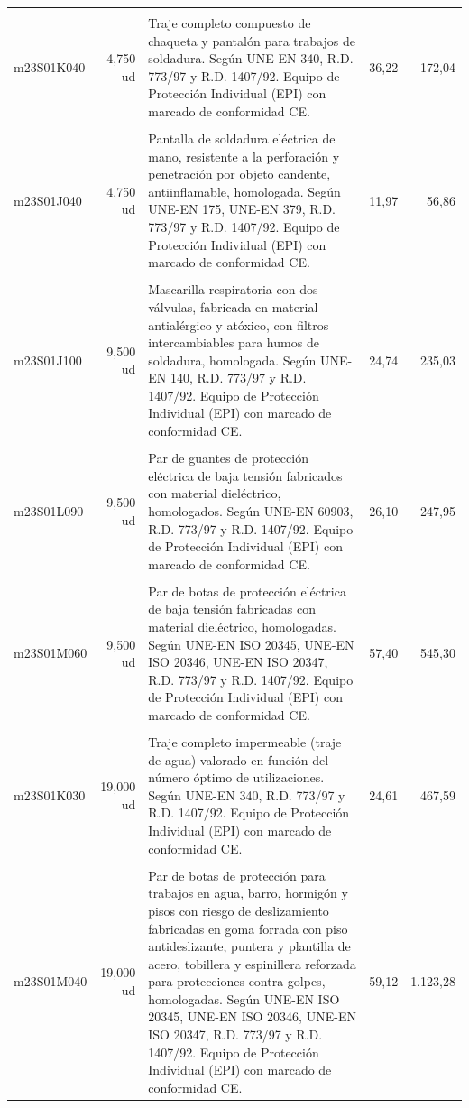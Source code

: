 \documentclass{book}%
\begin{document}
\begin{longtable}{lrlrr}
&&&&\\%
m23S01K040&     4,750 ud&\multicolumn{1}{p{5cm}}{Traje completo compuesto de chaqueta y pantalón para trabajos de soldadura. Según UNE{-}EN 340, R.D. 773/97 y R.D. 1407/92. Equipo de Protección Individual (EPI) con marcado de conformidad CE.}&     36,22&172,04\\%
&&&&\\%
m23S01J040&     4,750 ud&\multicolumn{1}{p{5cm}}{Pantalla de soldadura eléctrica de mano, resistente a la perforación y penetración por objeto candente, antiinflamable, homologada. Según UNE{-}EN 175, UNE{-}EN 379, R.D. 773/97 y R.D. 1407/92. Equipo de Protección Individual (EPI) con marcado de conformidad CE.}&     11,97&56,86\\%
&&&&\\%
m23S01J100&     9,500 ud&\multicolumn{1}{p{5cm}}{Mascarilla respiratoria con dos válvulas, fabricada en material antialérgico y atóxico, con filtros intercambiables para humos de soldadura, homologada. Según UNE{-}EN 140, R.D. 773/97 y R.D. 1407/92. Equipo de Protección Individual (EPI) con marcado de conformidad CE.}&     24,74&235,03\\%
&&&&\\%
m23S01L090&     9,500 ud&\multicolumn{1}{p{5cm}}{Par de guantes de protección eléctrica de baja tensión fabricados con material dieléctrico, homologados. Según UNE{-}EN 60903, R.D. 773/97 y R.D. 1407/92. Equipo de Protección Individual (EPI) con marcado de conformidad CE.}&     26,10&247,95\\%
&&&&\\%
m23S01M060&     9,500 ud&\multicolumn{1}{p{5cm}}{Par de botas de protección eléctrica de baja tensión fabricadas con material dieléctrico, homologadas. Según UNE{-}EN ISO 20345, UNE{-}EN ISO 20346, UNE{-}EN ISO 20347, R.D. 773/97 y R.D. 1407/92. Equipo de Protección Individual (EPI) con marcado de conformidad CE.}&     57,40&545,30\\%
&&&&\\%
m23S01K030&    19,000 ud&\multicolumn{1}{p{5cm}}{Traje completo impermeable (traje de agua) valorado en función del número óptimo de utilizaciones. Según UNE{-}EN 340, R.D. 773/97 y R.D. 1407/92. Equipo de Protección Individual (EPI) con marcado de conformidad CE.}&     24,61&467,59\\%
&&&&\\%
m23S01M040&    19,000 ud&\multicolumn{1}{p{5cm}}{Par de botas de protección para trabajos en agua, barro, hormigón y pisos con riesgo de deslizamiento fabricadas en goma forrada con piso antideslizante, puntera y plantilla de acero, tobillera y espinillera reforzada para protecciones contra golpes, homologadas. Según UNE{-}EN ISO 20345, UNE{-}EN ISO 20346, UNE{-}EN ISO 20347, R.D. 773/97 y R.D. 1407/92. Equipo de Protección Individual (EPI) con marcado de conformidad CE.}&     59,12&1.123,28\\%

\end{longtable}
\end{document}
